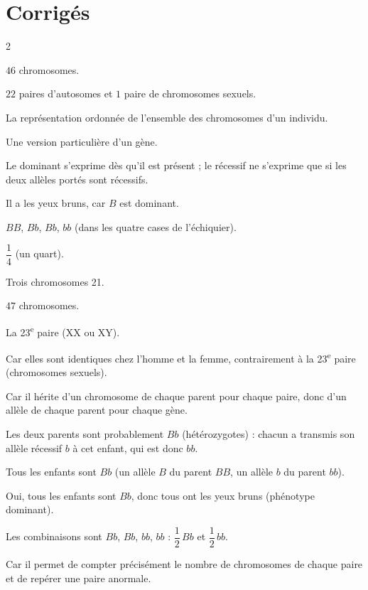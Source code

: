 \section{Corrigés}
\begin{multicols}{2}

$46$ chromosomes.

$22$ paires d'autosomes et $1$ paire de chromosomes sexuels.

La représentation ordonnée de l'ensemble des chromosomes d'un individu.

Une version particulière d'un gène.

Le dominant s'exprime dès qu'il est présent ; le récessif ne s'exprime que si les deux
allèles portés sont récessifs.

Il a les yeux bruns, car $B$ est dominant.

$BB$, $Bb$, $Bb$, $bb$ (dans les quatre cases de l'échiquier).

$\dfrac14$ (un quart).

Trois chromosomes 21.

$47$ chromosomes.

La 23\textsuperscript{e} paire (XX ou XY).

Car elles sont identiques chez l'homme et la femme, contrairement à la 23\textsuperscript{e}
paire (chromosomes sexuels).

Car il hérite d'un chromosome de chaque parent pour chaque paire, donc d'un allèle de
chaque parent pour chaque gène.

Les deux parents sont probablement $Bb$ (hétérozygotes) : chacun a transmis son allèle
récessif $b$ à cet enfant, qui est donc $bb$.

Tous les enfants sont $Bb$ (un allèle $B$ du parent $BB$, un allèle $b$ du parent $bb$).

Oui, tous les enfants sont $Bb$, donc tous ont les yeux bruns (phénotype dominant).

Les combinaisons sont $Bb$, $Bb$, $bb$, $bb$ : $\dfrac12\,Bb$ et $\dfrac12\,bb$.

Car il permet de compter précisément le nombre de chromosomes de chaque paire et de
repérer une paire anormale.


\end{multicols}
